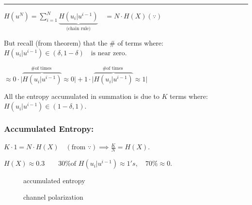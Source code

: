 \documentclass[11pt]{article}
\begin{document}
    \begin{center}\rule{0.5\linewidth}{0.5pt}\end{center}

\(H(u^N) = \sum\limits_{i=1}^N \underbrace{H(u_i | u^{i-1})}_\text{(chain rule)} \quad  = N \cdot H(X)\)\((\because)\)

But recall (from theorem) that the \# of terms where:
\(H(u_i | u^{i-1}) \in (\delta, 1-\delta) \quad \text{is near zero.}\)

\(\approx 0 \cdot \Big| \overbrace{H(u_i | u^{i-1})}^{\# \text{of times }} \approx 0 \Big| + 1 \cdot \Big| \overbrace{H(u_i | u^{i-1})}^{\# \text{of times }} \approx 1 \Big|\)

All the entropy accumulated in summation is due to \(K\) terms where:
\(H(u_i | u^{i-1}) \in (1 - \delta, 1).\)

\subsubsection{Accumulated Entropy:}\label{accumulated-entropy}

\(K \cdot 1 = N \cdot H(X) \quad (\text{from }\because) \implies \frac{K}{N} = H(X).\)

\(H(X) \approx 0.3 \qquad \text{30\% of } H(u_i | u^{i-1}) \approx 1's, \quad 70\% \approx 0.\)

\begin{figure}
\centering
{}
\caption{accumulated entropy}
\end{figure}

\begin{figure}
\centering
{}
\caption{channel polarization}
\end{figure}
\end{document}
